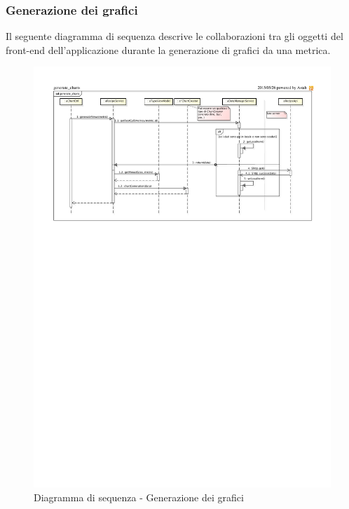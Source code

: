 	\subsubsection{Generazione dei grafici} %
	\label{sub:generazione_dei_grafici}
	Il seguente diagramma di sequenza descrive le collaborazioni tra gli oggetti del front-end dell'applicazione durante la generazione di grafici da una metrica. \newline

\begin{figure}[htbp]
	\centering
	\centerline{\includegraphics[scale=1.03]{./images/sequence_diagram/client_chart_generation.pdf}}
	\caption{Diagramma di sequenza - Generazione dei grafici}
\end{figure}

	

